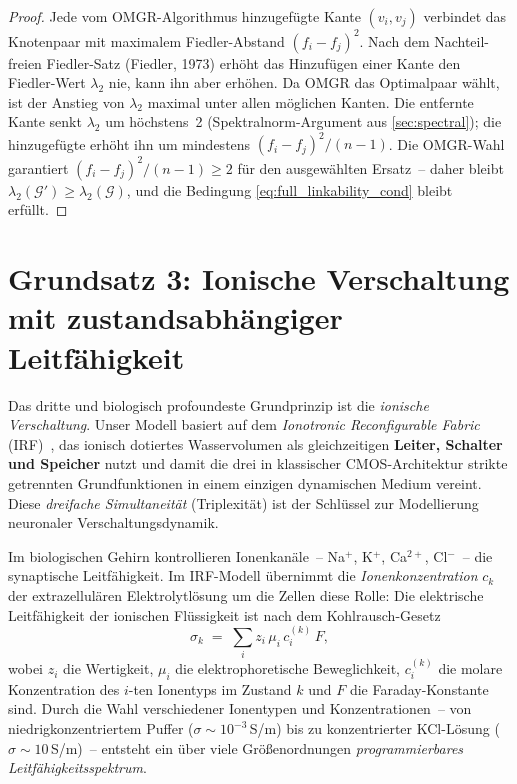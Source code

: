 ﻿\documentclass[12pt, a4paper, openany]{report}
\newcommand{\calG}{\mathcal{G}}
\begin{document}
\begin{proof}
Jede vom OMGR-Algorithmus hinzugefügte Kante $(v_i, v_j)$ verbindet das
Knotenpaar mit maximalem Fiedler-Abstand $(f_i - f_j)^2$.  Nach dem
Nachteil-freien Fiedler-Satz (Fiedler, 1973) erhöht das Hinzufügen einer
Kante den Fiedler-Wert $\lambda_2$ nie, kann ihn aber erhöhen.  Da OMGR
das Optimalpaar wählt, ist der Anstieg von $\lambda_2$ maximal unter allen
möglichen Kanten.  Die entfernte Kante senkt $\lambda_2$ um höchstens~2
(Spektralnorm-Argument aus \cref{sec:spectral}); die hinzugefügte erhöht
ihn um mindestens $(f_i - f_j)^2 / (n-1)$.  Die OMGR-Wahl garantiert
$(f_i - f_j)^2 / (n-1) \geq 2$ für den ausgewählten Ersatz~-- daher bleibt
$\lambda_2(\calG') \geq \lambda_2(\calG)$, und die Bedingung
\eqref{eq:full_linkability_cond} bleibt erfüllt.
\end{proof}

\section{Grundsatz 3: Ionische Verschaltung mit zustandsabhängiger Leitfähigkeit}
\label{sec:bio_ionic}

Das dritte und biologisch profoundeste Grundprinzip ist die \emph{ionische
Verschaltung}.  Unser Modell basiert auf dem \emph{Ionotronic Reconfigurable
Fabric} (IRF)~\cite{epp2026iono}, das ionisch dotiertes Wasservolumen als
gleichzeitigen \textbf{Leiter, Schalter und Speicher} nutzt und damit die
drei in klassischer CMOS-Architektur strikte getrennten Grundfunktionen in
einem einzigen dynamischen Medium vereint.  Diese \emph{dreifache
Simultaneität} (Triplexität) ist der Schlüssel zur Modellierung neuronaler
Verschaltungsdynamik.

Im biologischen Gehirn kontrollieren Ionen\-kanäle~-- Na$^+$, K$^+$,
Ca$^{2+}$, Cl$^-$~-- die synaptische Leitfähigkeit.  Im IRF-Modell
übernimmt die \emph{Ionenkonzentration} $c_k$ der extrazellulären Elektrolyt\-lösung
um die Zellen diese Rolle: Die elektrische Leitfähigkeit der ionischen
Flüssigkeit ist nach dem Kohlrausch-Gesetz~\cite{epp2026iono}
\begin{equation}
  \label{eq:iono_conductivity}
  \sigma_k \;=\; \sum_i z_i \,\mu_i \,c_i^{(k)}\, F,
\end{equation}
wobei $z_i$ die Wertigkeit, $\mu_i$ die elektrophoretische Beweglichkeit,
$c_i^{(k)}$ die molare Konzentration des $i$-ten Ionentyps im Zustand $k$
und $F$ die Faraday-Konstante sind.  Durch die Wahl verschiedener Ionentypen
und Konzentrationen~-- von nied\-rig\-konzentriertem Puffer ($\sigma \sim
10^{-3}$\,S/m) bis zu konzentrierter KCl-Lösung ($\sigma \sim 10$\,S/m)~--
entsteht ein über viele Größenordnungen \emph{programmierbares
Leitfähigkeitsspektrum}.
\end{document}
